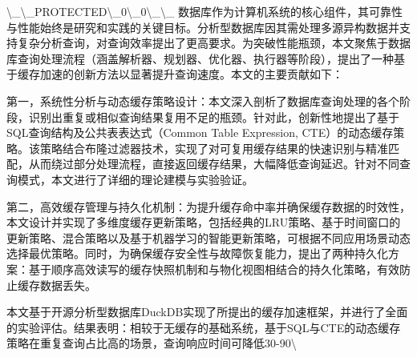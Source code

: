 \textbackslash{}_\textbackslash{}_PROTECTED\textbackslash{}_0\textbackslash{}_0\textbackslash{}_\textbackslash{}_
数据库作为计算机系统的核心组件，其可靠性与性能始终是研究和实践的关键目标。分析型数据库因其需处理多源异构数据并支持复杂分析查询，对查询效率提出了更高要求。为突破性能瓶颈，本文聚焦于数据库查询处理流程（涵盖解析器、规划器、优化器、执行器等阶段），提出了一种基于缓存加速的创新方法以显著提升查询速度。本文的主要贡献如下：

第一，系统性分析与动态缓存策略设计：本文深入剖析了数据库查询处理的各个阶段，识别出重复或相似查询结果复用不足的瓶颈。针对此，创新性地提出了基于SQL查询结构及公共表表达式（Common Table Expression, CTE）的动态缓存策略。该策略结合布隆过滤器技术，实现了对可复用缓存结果的快速识别与精准匹配，从而绕过部分处理流程，直接返回缓存结果，大幅降低查询延迟。针对不同查询模式，本文进行了详细的理论建模与实验验证。

第二，高效缓存管理与持久化机制：为提升缓存命中率并确保缓存数据的时效性，本文设计并实现了多维度缓存更新策略，包括经典的LRU策略、基于时间窗口的更新策略、混合策略以及基于机器学习的智能更新策略，可根据不同应用场景动态选择最优策略。同时，为确保缓存安全性与故障恢复能力，提出了两种持久化方案：基于顺序高效读写的缓存快照机制和与物化视图相结合的持久化策略，有效防止缓存数据丢失。

本文基于开源分析型数据库DuckDB实现了所提出的缓存加速框架，并进行了全面的实验评估。结果表明：相较于无缓存的基础系统，基于SQL与CTE的动态缓存策略在重复查询占比高的场景，查询响应时间可降低30-90\textbackslash{}%
